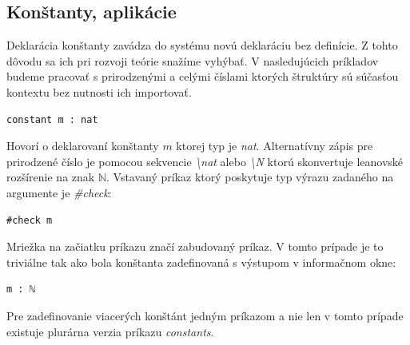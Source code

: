 \documentclass[a4paper,10pt,oneside]{report}%
\begin{document}
\subsection{Konštanty, aplikácie}
    Deklarácia konštanty zavádza do systému novú deklaráciu bez definície.
    Z tohto dôvodu sa ich pri rozvoji teórie snažíme vyhýbať.
    V nasledujúcich príkladov budeme pracovať s prirodzenými a celými číslami
ktorých štruktúry sú súčasťou kontextu bez nutnosti ich importovať.
\begin{lstlisting}
constant m : nat
\end{lstlisting}
    Hovorí o deklarovaní konštanty $m$ ktorej typ je \emph{nat}.
    Alternatívny zápis pre prirodzené číslo je pomocou sekvencie \emph{\textbackslash nat}
alebo \emph{\textbackslash N} ktorú skonvertuje leanovské rozšírenie na znak $\mathbb{N}$.
    Vstavaný príkaz ktorý poskytuje typ výrazu zadaného na argumente je \emph{\#check}:
\begin{lstlisting}
#check m
\end{lstlisting}
    Mriežka na začiatku príkazu značí zabudovaný príkaz.
    V tomto prípade je to triviálne tak ako bola konštanta zadefinovaná s výstupom
v informačnom okne:
\begin{lstlisting}
m : ℕ
\end{lstlisting}
    Pre zadefinovanie viacerých konštánt jedným príkazom a nie len v tomto prípade
existuje plurárna verzia príkazu \emph{constants}.
\end{document}

